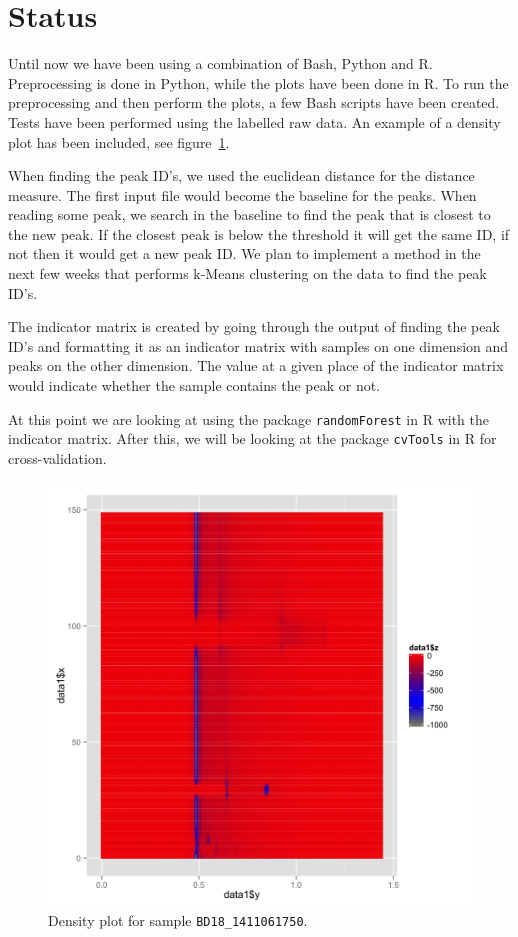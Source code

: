 \section{Status}
Until now we have been using a combination of Bash, Python and R. Preprocessing is done in Python, while the plots have been done in R. To run the preprocessing and then perform the plots, a few Bash scripts have been created. Tests have been performed using the labelled raw data. An example of a density plot has been included, see figure~\ref{fig:density}.

When finding the peak ID's, we used the euclidean distance for the distance measure. The first input file would become the baseline for the peaks. When reading some peak, we search in the baseline to find the peak that is closest to the new peak. If the closest peak is below the threshold it will get the same ID, if not then it would get a new peak ID. We plan to implement a method in the next few weeks that performs k-Means clustering on the data to find the peak ID's.

The indicator matrix is created by going through the output of finding the peak ID's and formatting it as an indicator matrix with samples on one dimension and peaks on the other dimension. The value at a given place of the indicator matrix would indicate whether the sample contains the peak or not.

At this point we are looking at using the package \texttt{randomForest} in R with the indicator matrix. After this, we will be looking at the package \texttt{cvTools} in R for cross-validation.
\newpage
\begin{figure}[h]
\centering
\includegraphics[width=1.00\textwidth]{../../plots/density/BD18_1411061750_ims.png}
\caption{Density plot for sample \texttt{BD18\_1411061750}.}
\label{fig:density}
\end{figure}

